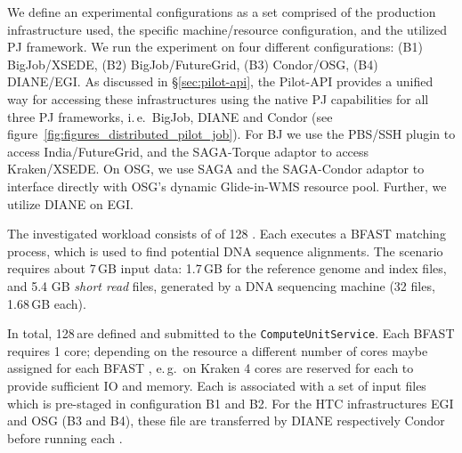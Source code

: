 \documentclass{sig-alternate}
\begin{document}
We define an experimental configurations as a set comprised of the
production infrastructure used, the specific machine/resource
configuration, and the utilized PJ framework.  We run the experiment
on four different configurations: (B1) BigJob/XSEDE, (B2)
BigJob/FutureGrid, (B3) Condor/OSG, (B4) DIANE/EGI. As discussed in
\S\ref{sec:pilot-api}, the Pilot-API provides a unified way for
accessing these infrastructures using the native PJ capabilities for
all three PJ frameworks, i.\,e.\ BigJob, DIANE and Condor (see
figure~\ref{fig:figures_distributed_pilot_job}).  For BJ we use the
PBS/SSH plugin to access India/FutureGrid, and the SAGA-Torque adaptor
to access Kraken/XSEDE. On OSG, we use SAGA and the SAGA-Condor
adaptor to interface directly with OSG's dynamic Glide-in-WMS resource
pool. Further, we utilize DIANE on
EGI. %

The investigated workload consists of of 128 \cus. Each \cu executes a
BFAST matching process, which is used to find potential DNA sequence
alignments. The scenario requires about 7\,GB input data: 1.7\,GB for
the reference genome and index files, and 5.4 GB \textit{short read}
files, generated by a DNA sequencing machine (32 files, 1.68\,GB
each).

In total, 128\,\cus are defined and submitted to the
\texttt{Compute\-Unit\-Service}. Each BFAST \cu requires 1 core;
depending on the resource a different number of cores maybe assigned
for each BFAST \cu, e.\,g.\ on Kraken 4 cores are reserved for each
\cu to provide sufficient IO and memory. Each \cu is associated with a
set of input files which is pre-staged in configuration B1 and
B2. For the HTC infrastructures EGI and OSG (B3 and B4),
these file are transferred by DIANE respectively Condor before running
each \cu.  %

\end{document}
